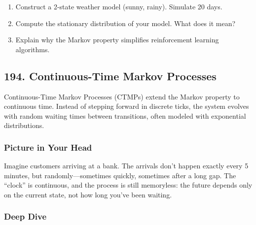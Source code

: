 \documentclass[
  letterpaper,
  DIV=11,
  numbers=noendperiod]{scrreprt}
\providecommand{\tightlist}{%
  \setlength{\itemsep}{0pt}\setlength{\parskip}{0pt}}
\begin{document}
\begin{enumerate}
\def\labelenumi{\arabic{enumi}.}
\tightlist
\item
  Construct a 2-state weather model (sunny, rainy). Simulate 20 days.
\item
  Compute the stationary distribution of your model. What does it mean?
\item
  Explain why the Markov property simplifies reinforcement learning
  algorithms.
\end{enumerate}

\subsection{194. Continuous-Time Markov
Processes}\label{continuous-time-markov-processes}

Continuous-Time Markov Processes (CTMPs) extend the Markov property to
continuous time. Instead of stepping forward in discrete ticks, the
system evolves with random waiting times between transitions, often
modeled with exponential distributions.

\subsubsection{Picture in Your Head}\label{picture-in-your-head-193}

Imagine customers arriving at a bank. The arrivals don't happen exactly
every 5 minutes, but randomly---sometimes quickly, sometimes after a
long gap. The ``clock'' is continuous, and the process is still
memoryless: the future depends only on the current state, not how long
you've been waiting.

\subsubsection{Deep Dive}\label{deep-dive-193}
\end{document}
